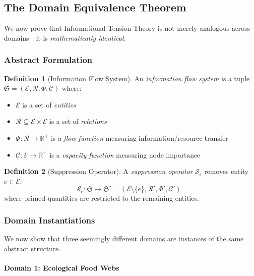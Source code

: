 \documentclass[12pt,a4paper]{article}
\theoremstyle{definition}
\newtheorem{definition}{Definition}[section]
\theoremstyle{remark}
\begin{document}
\subsection{The Domain Equivalence Theorem}

We now prove that Informational Tension Theory is not merely analogous across domains—it is \emph{mathematically identical}.

\subsubsection{Abstract Formulation}

\begin{definition}[Information Flow System]
An \emph{information flow system} is a tuple $\mathfrak{S} = (\mathcal{E}, \mathcal{R}, \Phi, \mathcal{C})$ where:
\begin{itemize}
    \item $\mathcal{E}$ is a set of \emph{entities}
    \item $\mathcal{R} \subseteq \mathcal{E} \times \mathcal{E}$ is a set of \emph{relations}
    \item $\Phi: \mathcal{R} \to \mathbb{R}^+$ is a \emph{flow function} measuring information/resource transfer
    \item $\mathcal{C}: \mathcal{E} \to \mathbb{R}^+$ is a \emph{capacity function} measuring node importance
\end{itemize}
\end{definition}

\begin{definition}[Suppression Operator]
A \emph{suppression operator} $\mathcal{S}_e$ removes entity $e \in \mathcal{E}$:
\begin{equation}
    \mathcal{S}_e: \mathfrak{S} \mapsto \mathfrak{S}' = (\mathcal{E} \setminus \{e\}, \mathcal{R}', \Phi', \mathcal{C}')
\end{equation}
where primed quantities are restricted to the remaining entities.
\end{definition}

\subsubsection{Domain Instantiations}

We now show that three seemingly different domains are instances of the same abstract structure.

\paragraph{Domain 1: Ecological Food Webs}
\end{document}

